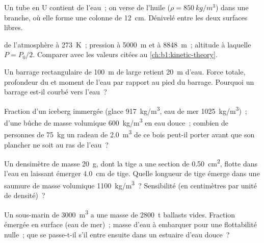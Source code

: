\begin{exercise}[$\star$]\label{exo:b1:fluid-statics:4}
Un tube en U contient de l'eau~; on verse de l'huile ($\rho = \qty{850}{kg/m^3}$)
dans une branche, où elle forme une colonne de \qty{12}{cm}. Dénivelé entre
les deux surfaces libres.
\end{exercise}

\begin{exercise}[$\star\star$]\label{exo:b1:fluid-statics:5}
 de l'atmosphère à \qty{273}{K}~; pression à \qty{5000}{m}
et à \qty{8848}{m}~; altitude à laquelle $P = P_0/2$. Comparer avec les
valeurs citées au \cref{ch:b1:kinetic-theory}.
\end{exercise}

\begin{exercise}[$\star\star$]\label{exo:b1:fluid-statics:6}
Un barrage rectangulaire de \qty{100}{m} de large retient \qty{20}{m} d'eau.
Force totale, profondeur du  et moment de l'eau par
rapport au pied du barrage. Pourquoi un barrage est-il courbé vers l'eau~?
\end{exercise}

\begin{exercise}[$\star\star$]\label{exo:b1:fluid-statics:7}
Fraction d'un iceberg immergée (glace \qty{917}{kg/m^3}, eau de mer
\qty{1025}{kg/m^3})~; d'une bûche de masse volumique \qty{600}{kg/m^3} en eau
douce~; combien de personnes de \qty{75}{kg} un radeau de \qty{2.0}{m^3} de
ce bois peut-il porter avant que son plancher ne soit au ras de l'eau~?
\end{exercise}

\begin{exercise}[$\star\star$]\label{exo:b1:fluid-statics:8}
Un densimètre de masse \qty{20}{g}, dont la tige a une section de
\qty{0.50}{cm^2}, flotte dans l'eau en laissant émerger \qty{4.0}{cm} de tige.
Quelle longueur de tige émerge dans une saumure de masse volumique
\qty{1100}{kg/m^3}~? Sensibilité (en centimètres par unité de densité)~?
\end{exercise}

\begin{exercise}[$\star\star$]\label{exo:b1:fluid-statics:9}
Un sous-marin de \qty{3000}{m^3} a une masse de \qty{2800}{t} ballasts vides.
Fraction émergée en surface (eau de mer)~; masse d'eau à embarquer pour une
flottabilité nulle~; que se passe-t-il s'il entre ensuite dans un estuaire
d'eau douce~?
\end{exercise}

